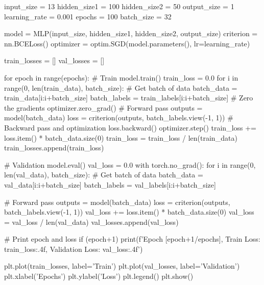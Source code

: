 \documentclass[11pt]{article}
\begin{document}
\begin{python}
input_size = 13
hidden_size1 = 100
hidden_size2 = 50
output_size = 1
learning_rate = 0.001
epochs = 100
batch_size = 32

model = MLP(input_size, hidden_size1, hidden_size2, output_size)
criterion = nn.BCELoss()
optimizer = optim.SGD(model.parameters(), lr=learning_rate)

train_losses = []
val_losses = []

for epoch in range(epochs):
    # Train
    model.train()
    train_loss = 0.0
    for i in range(0, len(train_data), batch_size):
        # Get batch of data
        batch_data = train_data[i:i+batch_size]
        batch_labels = train_labels[i:i+batch_size]
        # Zero the gradients
        optimizer.zero_grad()
        # Forward pass
        outputs = model(batch_data)
        loss = criterion(outputs, batch_labels.view(-1, 1))
        # Backward pass and optimization
        loss.backward()
        optimizer.step()
        train_loss += loss.item() * batch_data.size(0)
    train_loss = train_loss / len(train_data)
    train_losses.append(train_loss)
    
    # Validation
    model.eval()
    val_loss = 0.0
    with torch.no_grad():
        for i in range(0, len(val_data), batch_size):
            # Get batch of data
            batch_data = val_data[i:i+batch_size]
            batch_labels = val_labels[i:i+batch_size]            

            # Forward pass
            outputs = model(batch_data)
            loss = criterion(outputs, batch_labels.view(-1, 1))
            val_loss += loss.item() * batch_data.size(0)
        val_loss = val_loss / len(val_data)
        val_losses.append(val_loss)
    
    # Print epoch and loss
    if (epoch+1) %
        print(f'Epoch [{epoch+1}/{epochs}], Train Loss: {train_loss:.4f}, Validation Loss: {val_loss:.4f}')

plt.plot(train_losses, label='Train')
plt.plot(val_losses, label='Validation')
plt.xlabel('Epochs')
plt.ylabel('Loss')
plt.legend()
plt.show()
\end{python}
  
\end{document}

